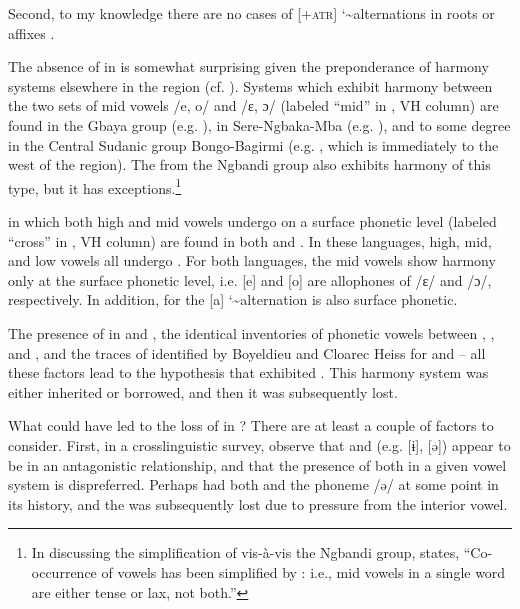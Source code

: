 \documentclass[output=paper,colorlinks,citecolor=brown]{langscibook}
\begin{document}
Second, to my knowledge there are no cases of [+\textsc{atr}] \char`\~  alternations in  roots or affixes \citep[500]{Casali2008}.

The absence of  in  is somewhat surprising given the preponderance of harmony systems elsewhere in the region (cf. ). Systems which exhibit harmony between the two sets of mid vowels /e, o/ and /ɛ, ɔ/ (labeled “mid” in , VH column) are found in the Gbaya group (e.g. ), in Sere-Ngbaka-Mba  (e.g. ), and to some degree in the Central Sudanic  group Bongo-Bagirmi  (e.g. , which is immediately to the west of the  region). The   from the Ngbandi  group also exhibits harmony of this type, but it has exceptions.\footnote{In discussing the simplification of  vis-à-vis the Ngbandi  group, \citet[313]{Samarin2000} states, “Co-occurrence of vowels has been simplified by : i.e., mid vowels in a single word are either tense or lax, not both.”}

 in which both high and mid vowels undergo  on a surface phonetic level (labeled “cross” in , VH column) are found in both  and . In these languages, high, mid, and low vowels all undergo . For both languages, the mid vowels show harmony only at the surface phonetic level, i.e. [e] and [o] are allophones of /ɛ/ and /ɔ/, respectively. In addition, for  the [a] \char`\~ \space [ə] alternation is also surface phonetic.

The presence of  in  and , the identical inventories of phonetic vowels between , , and , and the traces of  identified by Boyeldieu and Cloarec Heiss for  and  -- all these factors lead to the hypothesis that  exhibited . This harmony system was either inherited or borrowed, and then it was subsequently lost.

What could have led to the loss of  in ? There are at least a couple of factors to consider. First, in a crosslinguistic survey, \citet{RolleEtAl2017} observe that  and  (e.g. [ɨ], [ə]) appear to be in an antagonistic relationship, and that the presence of both in a given vowel system  is dispreferred. Perhaps  had both  and the phoneme /ə/ at some point in its history, and the  was subsequently lost due to pressure from the interior vowel.
\end{document}
